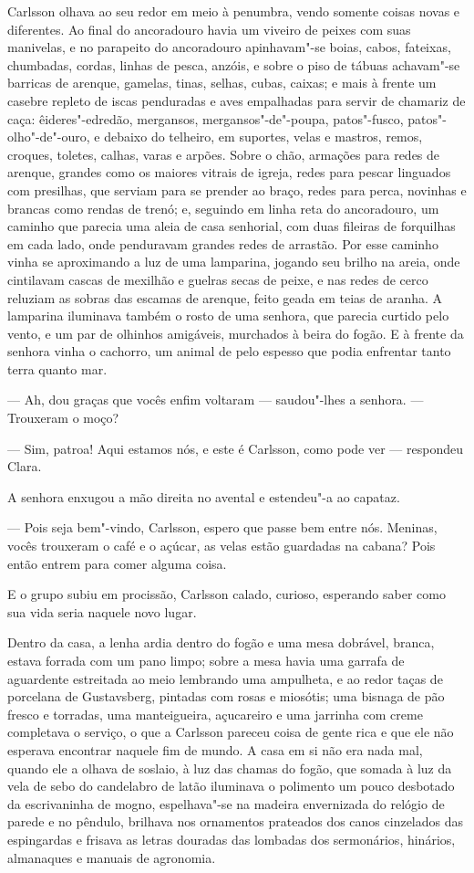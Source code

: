 Carlsson olhava ao seu redor em meio à penumbra, vendo somente coisas novas e
diferentes. Ao final do ancoradouro havia um viveiro de peixes com suas manivelas, e
no parapeito do ancoradouro apinhavam"-se boias, cabos, fateixas, chumbadas,
cordas, linhas de pesca, anzóis, e sobre o piso de tábuas achavam"-se barricas de arenque,
gamelas, tinas, selhas, cubas, caixas; e mais à frente um casebre repleto de
iscas penduradas e aves empalhadas para servir de chamariz de caça:
êideres"-edredão, mergansos, mergansos"-de"-poupa, patos"-fusco, patos"-olho"-de"-ouro,
e debaixo do telheiro, em suportes, velas e mastros, remos, croques, toletes,
calhas, varas e arpões. Sobre o chão, armações para redes de arenque, grandes
como os maiores vitrais de igreja, redes para pescar linguados com presilhas,
que serviam para se prender ao braço, redes para perca, novinhas e brancas como
rendas de trenó; e, seguindo em linha reta do ancoradouro, um caminho que
parecia uma aleia de casa senhorial, com duas fileiras de forquilhas em cada
lado, onde penduravam grandes redes de arrastão. Por esse caminho vinha se
aproximando a luz de uma lamparina, jogando seu brilho na areia, onde cintilavam
cascas de mexilhão e guelras secas de peixe, e nas redes de cerco reluziam as
sobras das escamas de arenque, feito geada em teias de aranha. A lamparina
iluminava também o rosto de uma senhora, que parecia curtido pelo vento, e um
par de olhinhos amigáveis, murchados à beira do fogão. E à frente da senhora
vinha o cachorro, um animal de pelo espesso que podia enfrentar tanto terra
quanto mar.

--- Ah, dou graças que vocês enfim voltaram --- saudou"-lhes a senhora. ---
Trouxeram o moço?

--- Sim, patroa! Aqui estamos nós, e este é Carlsson, como pode ver --- respondeu
Clara.

A senhora enxugou a mão direita no avental e estendeu"-a ao capataz.

--- Pois seja bem"-vindo, Carlsson, espero que passe bem entre nós. Meninas, vocês
trouxeram o café e o açúcar, as velas estão guardadas na cabana? Pois então
entrem para comer alguma coisa.

E o grupo subiu em procissão, Carlsson calado, curioso, esperando saber como sua
vida seria naquele novo lugar.

Dentro da casa, a lenha ardia dentro do fogão e uma mesa dobrável, branca,
estava forrada com um pano limpo; sobre a mesa havia uma garrafa de aguardente
estreitada ao meio lembrando uma ampulheta, e ao redor taças de porcelana de
Gustavsberg, pintadas com rosas e miosótis; uma bisnaga de pão fresco e
torradas, uma manteigueira, açucareiro e uma jarrinha com creme completava o
serviço, o que a Carlsson pareceu coisa de gente rica e que ele não esperava
encontrar naquele fim de mundo. A casa em si não era nada mal, quando ele a
olhava de soslaio, à luz das chamas do fogão, que somada à luz da vela de
sebo do candelabro de latão iluminava o polimento um pouco desbotado da
escrivaninha de mogno, espelhava"-se na madeira envernizada do relógio de parede
e no pêndulo, brilhava nos ornamentos prateados dos canos cinzelados das
espingardas e frisava as letras douradas das lombadas dos sermonários, 
hinários, almanaques e manuais de agronomia.

